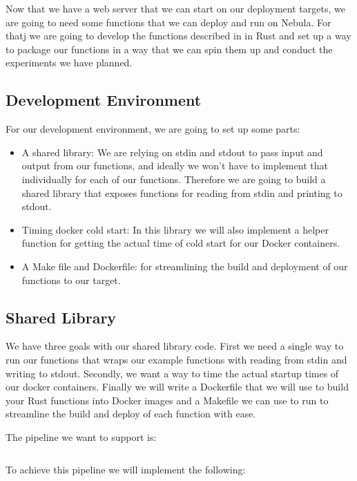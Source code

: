 \documentclass[
  table]{report}
\providecommand{\tightlist}{%
  \setlength{\itemsep}{0pt}\setlength{\parskip}{0pt}}
\begin{document}
Now that we have a web server that we can start on our deployment
targets, we are going to need some functions that we can deploy and run
on Nebula. For thatj we are going to develop the functions described in
 in Rust and set up a way to package our
functions in a way that we can spin them up and conduct the experiments
we have planned.

\subsection{Development Environment}

For our development environment, we are going to set up some parts:

\begin{itemize}
\tightlist
\item
  A shared library: We are relying on stdin and stdout to pass input and
  output from our functions, and ideally we won't have to implement that
  individually for each of our functions. Therefore we are going to
  build a shared library that exposes functions for reading from stdin
  and printing to stdout.
\item
  Timing docker cold start: In this library we will also implement a
  helper function for getting the actual time of cold start for our
  Docker containers.
\item
  A Make file and Dockerfile: for streamlining the build and deployment
  of our functions to our target.
\end{itemize}

\subsection{Shared Library}

We have three goals with our shared library code. First we need a single
way to run our functions that wraps our example functions with reading
from stdin and writing to stdout. Secondly, we want a way to time the
actual startup times of our docker containers. Finally we will write a
Dockerfile that we will use to build your Rust functions into Docker
images and a Makefile we can use to run to streamline the build and
deploy of each function with ease.

The pipeline we want to support is:

\inputminted[firstline=6, lastline=9]{bash}{assets/code/commands.sh}

To achieve this pipeline we will implement the following:
\end{document}
